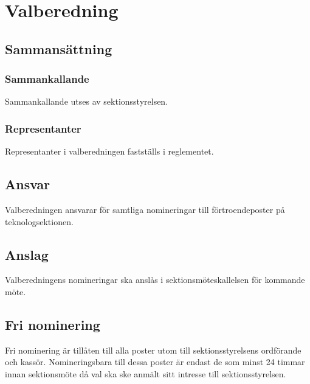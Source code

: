 \section{Valberedning}
\label{sec:valberedning}
\subsection{Sammansättning}
\subsubsection{Sammankallande}
Sammankallande utses av sektionsstyrelsen.
\subsubsection{Representanter}
Representanter i valberedningen fastställs i reglementet.
\subsection{Ansvar}
Valberedningen ansvarar för samtliga nomineringar till förtroendeposter på teknologsektionen.
\subsection{Anslag}
Valberedningens nomineringar ska anslås i sektionsmöteskallelsen för kommande möte.
\subsection{Fri nominering}
Fri nominering är tillåten till alla poster utom till sektionsstyrelsens ordförande och kassör. Nomineringsbara till dessa poster är endast de som minst 24 timmar innan sektionsmöte då val ska ske anmält sitt intresse till sektionsstyrelsen.

